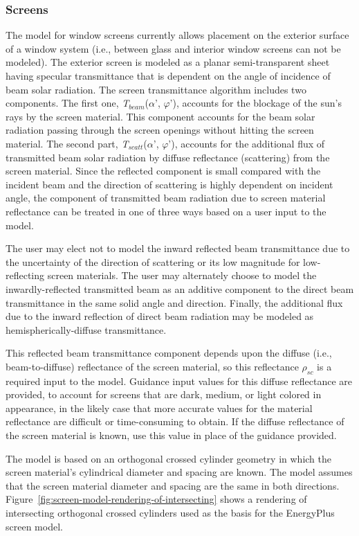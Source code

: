 \subsubsection{Screens}\label{screens}

The model for window screens currently allows placement on the exterior surface of a window system (i.e., between glass and interior window screens can not be modeled). The exterior screen is modeled as a planar semi-transparent sheet having specular transmittance that is dependent on the angle of incidence of beam solar radiation. The screen transmittance algorithm includes two components. The first one, \emph{T\(_{beam}\)}(\(\alpha\)', \(\varphi\)'), accounts for the blockage of the sun's rays by the screen material. This component accounts for the beam solar radiation passing through the screen openings without hitting the screen material. The second part, \emph{T\(_{scatt}\)}(\(\alpha\)', \(\varphi\)'), accounts for the additional flux of transmitted beam solar radiation by diffuse reflectance (scattering) from the screen material. Since the reflected component is small compared with the incident beam and the direction of scattering is highly dependent on incident angle, the component of transmitted beam radiation due to screen material reflectance can be treated in one of three ways based on a user input to the model.

The user may elect not to model the inward reflected beam transmittance due to the uncertainty of the direction of scattering or its low magnitude for low-reflecting screen materials. The user may alternately choose to model the inwardly-reflected transmitted beam as an additive component to the direct beam transmittance in the same solid angle and direction. Finally, the additional flux due to the inward reflection of direct beam radiation may be modeled as hemispherically-diffuse transmittance.

This reflected beam transmittance component depends upon the diffuse (i.e., beam-to-diffuse) reflectance of the screen material, so this reflectance \(\rho_{sc}\) is a required input to the model. Guidance input values for this diffuse reflectance are provided, to account for screens that are dark, medium, or light colored in appearance, in the likely case that more accurate values for the material reflectance are difficult or time-consuming to obtain. If the diffuse reflectance of the screen material is known, use this value in place of the guidance provided.

The model is based on an orthogonal crossed cylinder geometry in which the screen material's cylindrical diameter and spacing are known. The model assumes that the screen material diameter and spacing are the same in both directions. Figure~\ref{fig:screen-model-rendering-of-intersecting} shows a rendering of intersecting orthogonal crossed cylinders used as the basis for the EnergyPlus screen model.

